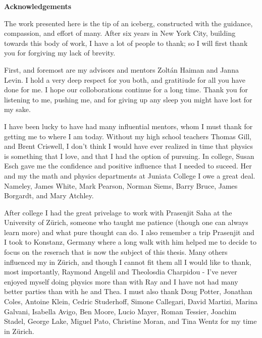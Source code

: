 \newpage

\begin{center}
    {\large \bf Acknowledgements }
\end{center}

\vspace{-0.2cm}


The work presented here is the tip of an iceberg, constructed with the
guidance, compassion, and effort of many. After six years in New York City,
building towards this body of work, I have a lot of people to thank; so
I will first thank you for forgiving my lack of brevity.


First, and foremost are my advisors and mentors Zolt\'an Haiman and Janna
Levin. I hold a very deep respect for you both, and gratitiude for all you
have done for me. I hope our colloborations continue for a long time. Thank
you for listening to me, pushing me, and for giving up any sleep you might
have lost for my sake.



I have been lucky to have had many influential mentors, whom I must thank for
getting me to where I am today. Without my high school teachers Thomas Gill,
and Brent Criswell, I don't think I would have ever realized in time that
physics is something that I love, and that I had the option of pursuing. In
college, Susan Esch gave me the confidence and positive influence that I
needed to suceed. Her and my the math and physics departments at Juniata College I owe a great deal. Nameley, James White, Mark Pearson, Norman Siems, Barry Bruce, James Borgardt, and Mary Atchley.


After college I had the great privelage to work with Prasenjit Saha at the
University of Z\"urich, someone who taught me patience (though one can always
learn more) and what pure thought can do. I also remember a trip Prasenjit and
I took to Konstanz, Germany where a long walk with him helped me to decide
to focus on the reserach that is now the subject of this thesis.
Many others influenced my in Z\"urich, and though I cannot fit them all I would
like to thank, most importantly, Raymond Angelil and Theolosdia Charpidou -
I've never enjoyed myself doing physics more than with Ray and I have not had
many better parties than with he and Thea. I must also thank Doug Potter,
Jonathan Coles, Antoine Klein, Cedric Studerhoff, Simone Callegari, David
Martizi, Marina Galvani, Isabella Avigo, Ben Moore, Lucio Mayer, Roman
Tessier, Joachim Stadel, George Lake, Miguel Pato, Christine Moran, and Tina
Wentz for my time in Z\"urich.


